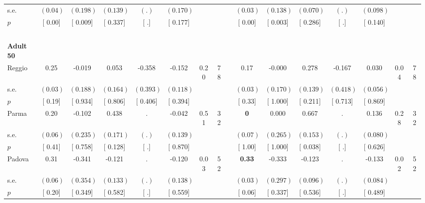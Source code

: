 \begin{longtable}{L{8em} c c c c c c c p{1em} c c c c c c c}
\quad \quad \quad \quad s.e.& $ (     0.04)$ & $ (    0.198)$ & $ (    0.139)$ & $ (        .)$ & $ (    0.170)$ & & & & $ (     0.03)$ & $ (    0.138)$ & $ (    0.070)$ & $ (        .)$ & $ (    0.098)$ & &  \\*
\quad \quad \quad \quad $ p$ & [     0.00] & [    0.009] & [    0.337] & [        .] & [    0.177] & & & & [     0.00] & [    0.003] & [    0.286] & [        .] & [    0.140] & &  \\[1em]
~\\[1em]
\quad \quad \textbf{Adult 50} & & & & & & & & & & & & & & & \\* 
\quad \quad \quad Reggio& 0.25 &    -0.019 &     0.053 &    -0.358 &    -0.152 &      0.20 &        78 & & 0.17 &    -0.000 &     0.278 &    -0.167 &     0.030 &      0.04 &        78  \\*
\quad \quad \quad \quad s.e.& $ (     0.03)$ & $ (    0.188)$ & $ (    0.164)$ & $ (    0.393)$ & $ (    0.118)$ & & & & $ (     0.03)$ & $ (    0.170)$ & $ (    0.139)$ & $ (    0.418)$ & $ (    0.056)$ & &  \\*
\quad \quad \quad \quad $ p$ & [     0.19] & [    0.934] & [    0.806] & [    0.406] & [    0.394] & & & & [     0.33] & [    1.000] & [    0.211] & [    0.713] & [    0.869] & &  \\[1em]
\quad \quad \quad Parma& 0.20 &    -0.102 &     0.438 &         . &    -0.042 &      0.51 &        32 & & \textbf{0} &     0.000 & $ \mathbf{    0.667}$ &         . &     0.136 &      0.28 &        32  \\*
\quad \quad \quad \quad s.e.& $ (     0.06)$ & $ (    0.235)$ & $ (    0.171)$ & $ (        .)$ & $ (    0.139)$ & & & & $ (     0.07)$ & $ (    0.265)$ & $ (    0.153)$ & $ (        .)$ & $ (    0.080)$ & &  \\*
\quad \quad \quad \quad $ p$ & [     0.41] & [    0.758] & [    0.128] & [        .] & [    0.870] & & & & [     1.00] & [    1.000] & [    0.038] & [        .] & [    0.626] & &  \\[1em]
\quad \quad \quad Padova& 0.31 &    -0.341 &    -0.121 &         . &    -0.120 &      0.03 &        52 & & \textbf{     0.33} &    -0.333 &    -0.123 &         . &    -0.133 &      0.02 &        52  \\*
\quad \quad \quad \quad s.e.& $ (     0.06)$ & $ (    0.354)$ & $ (    0.133)$ & $ (        .)$ & $ (    0.138)$ & & & & $ (     0.03)$ & $ (    0.297)$ & $ (    0.096)$ & $ (        .)$ & $ (    0.084)$ & &  \\*
\quad \quad \quad \quad $ p$ & [     0.20] & [    0.349] & [    0.582] & [        .] & [    0.559] & & & & [     0.06] & [    0.337] & [    0.536] & [        .] & [    0.489] & &  \\[1em]

\end{longtable}
